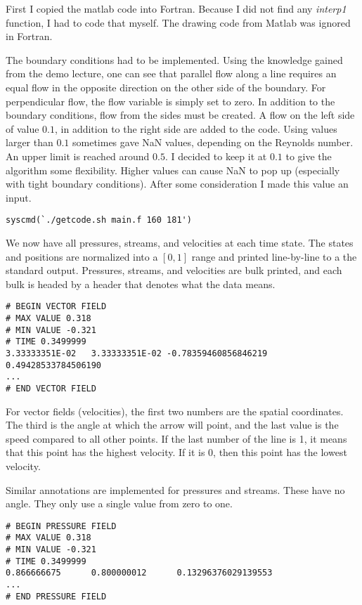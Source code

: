 \documentclass[listof=totoc]{report}
\begin{document}
First I copied the matlab code into Fortran. Because I did not find any \emph{interp1} function, I had to code that myself. The drawing code from Matlab was ignored in Fortran.

The boundary conditions had to be implemented. Using the knowledge gained from the demo lecture, one can see that parallel flow along a line requires an equal flow in the opposite direction on the other side of the boundary. For perpendicular flow, the flow variable is simply set to zero. In addition to the boundary conditions, flow from the sides must be created. A flow on the left side of value $0.1$, in addition to the right side are added to the code.
Using values larger than $0.1$ sometimes gave NaN values, depending on the Reynolds number. An upper limit is reached around $0.5$. I decided to keep it at $0.1$ to give the algorithm some flexibility. Higher values can cause NaN to pop up (especially with tight boundary conditions). After some consideration I made this value an input.

\begin{verbatim}
syscmd(`./getcode.sh main.f 160 181')
\end{verbatim}

We now have all pressures, streams, and velocities at each time state. The states and positions are normalized into a $[0, 1]$ range and printed line-by-line to a the standard output. Pressures, streams, and velocities are bulk printed, and each bulk is headed by a header that denotes what the data means.

\begin{verbatim}
# BEGIN VECTOR FIELD
# MAX VALUE 0.318
# MIN VALUE -0.321
# TIME 0.3499999
3.33333351E-02   3.33333351E-02 -0.78359460856846219       0.49428533784506190
...
# END VECTOR FIELD
\end{verbatim}

For vector fields (velocities), the first two numbers are the spatial coordinates. The third is the angle at which the arrow will point, and the last value is the speed compared to all other points. If the last number of the line is 1, it means that this point has the highest velocity. If it is 0, then this point has the lowest velocity.

Similar annotations are implemented for pressures and streams. These have no angle. They only use a single value from zero to one.

\begin{verbatim}
# BEGIN PRESSURE FIELD
# MAX VALUE 0.318
# MIN VALUE -0.321
# TIME 0.3499999
0.866666675      0.800000012      0.13296376029139553
...
# END PRESSURE FIELD
\end{verbatim}
\end{document}
